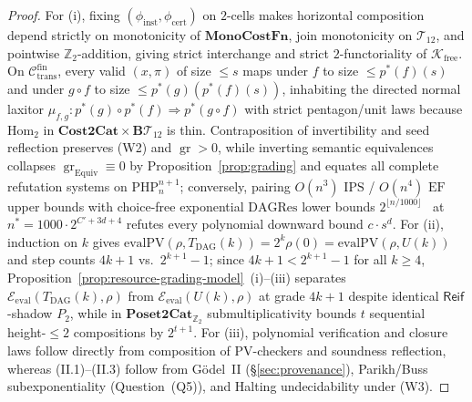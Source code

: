 \documentclass[11pt]{article}
\theoremstyle{plain}
\theoremstyle{definition}
\newcommand{\gr}{\operatorname{gr}}
\newcommand{\Hom}{\mathrm{Hom}}
\begin{document}
\begin{proof}
For (i), fixing $(\phi_{\mathrm{inst}}, \phi_{\mathrm{cert}})$ on $2$-cells makes horizontal composition depend strictly on monotonicity of $\mathbf{MonoCostFn}$, join monotonicity on $\mathcal{T}_{12}$, and pointwise $\mathbb{Z}_2$-addition, giving strict interchange and strict $2$-functoriality of $\mathcal{K}_{\mathrm{free}}$. On $\mathcal{C}_{\mathrm{trans}}^{\mathrm{fin}}$, every valid $(x,\pi)$ of size $\le s$ maps under $f$ to size $\le p^*(f)(s)$ and under $g \circ f$ to size $\le p^*(g)(p^*(f)(s))$, inhabiting the directed normal laxitor $\mu_{f,g} : p^*(g)\circ p^*(f) \Rightarrow p^*(g\circ f)$ with strict pentagon/unit laws because $\Hom_2$ in $\mathbf{Cost2Cat} \times \mathbf{B}\mathcal{T}_{12}$ is thin. Contraposition of invertibility and seed reflection preserves \textup{(W2)} and $\gr > 0$, while inverting semantic equivalences collapses $\gr_{\mathrm{Equiv}} \equiv 0$ by Proposition~\ref{prop:grading} and equates all complete refutation systems on $\mathrm{PHP}_n^{n+1}$; conversely, pairing $O(n^3)$ $\mathrm{IPS}$ / $O(n^4)$ $\mathrm{EF}$ upper bounds with choice-free exponential $\mathrm{DAGRes}$ lower bounds $2^{\lfloor n/1000\rfloor}$~\cite{Haken1985} at $n^* = 1000 \cdot 2^{C' + 3d + 4}$ refutes every polynomial downward bound $c\cdot s^d$. For (ii), induction on $k$ gives $\mathrm{evalPV}(\rho, T_{\mathrm{DAG}}(k)) = 2^k\rho(0) = \mathrm{evalPV}(\rho, U(k))$ and step counts $4k+1$ vs.\ $2^{k+1}-1$; since $4k+1 < 2^{k+1}-1$ for all $k \ge 4$, Proposition~\ref{prop:resource-grading-model}~(i)--(iii) separates $\mathcal{E}_{\mathrm{eval}}(T_{\mathrm{DAG}}(k), \rho)$ from $\mathcal{E}_{\mathrm{eval}}(U(k), \rho)$ at grade $4k+1$ despite identical $\mathsf{Reif}$-shadow $P_2$, while in $\mathbf{Poset2Cat}_{\mathbb{Z}_2}$ submultiplicativity bounds $t$ sequential height-$\le 2$ compositions by $2^{t+1}$. For (iii), polynomial verification and closure laws follow directly from composition of $\mathrm{PV}$-checkers and soundness reflection, whereas (II.1)--(II.3) follow from G\"odel~II (\S\ref{sec:provenance}), Parikh/Buss subexponentiality (Question~(Q5)), and Halting undecidability under \textup{(W3)}.
\end{proof}
\end{document}
